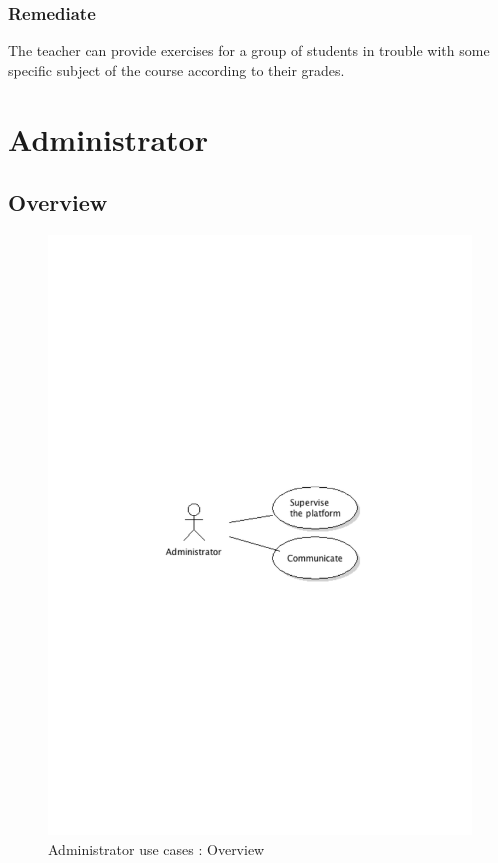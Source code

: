 		\subsubsection{Remediate}
			The teacher can provide exercises for a group of students in trouble with some specific subject of the course according to their grades.
\newpage
\section{Administrator}
	\subsection{Overview}
		\begin{figure}[ht]
			\begin{center}
				\includegraphics[width=\textwidth, trim=2cm 12cm 2cm 12cm]{UML_figure/UC/administrator/UC_Administrator_General.pdf}
				\caption{Administrator use cases : Overview}
			\end{center}
		\end{figure}
